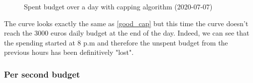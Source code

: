 \documentclass[12pt]{article}
\begin{document}
\begin{figure}[h!]
	\centering
	\caption{Spent budget over a day with capping algorithm (2020-07-07)}
	\label{bad_cap}
\end{figure}

The curve looks exactly the same as \autoref{good_cap} but this time the curve doesn't reach the 3000 euros daily budget at the end of the day. Indeed, we can see that the spending started at 8 p.m and therefore the unspent budget from the previous hours has been definitively "lost". 

\subsubsection{Per second budget}
\end{document}
